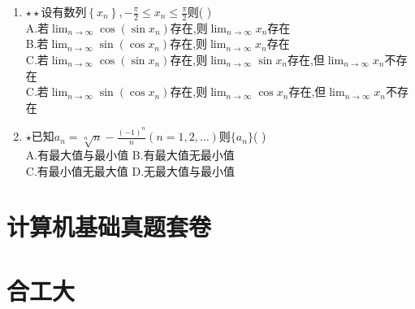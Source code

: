 \documentclass[12pt, a4paper, oneside, UTF8]{ctexbook}
\begin{document}
\begin{enumerate}
    \item $\star\star$设有数列$\left\{x_n\right\},-\frac{\pi}{2}\leq x_n\leq \frac{\pi}{2}$则(    )\\
    A.若$\displaystyle\lim_{n\to\infty}\cos{(\sin{x_n})}$存在,则$\displaystyle\lim_{n\to\infty}x_n$存在 \\
    B.若$\displaystyle\lim_{n\to\infty}\sin{(\cos{x_n})}$存在,则$\displaystyle\lim_{n\to\infty}x_n$存在 \\
    C.若$\displaystyle\lim_{n\to\infty}\cos{(\sin{x_n})}$存在,则$\displaystyle\lim_{n\to\infty}\sin{x_n}$存在,但$\displaystyle\lim_{n\to\infty}x_n$不存在 \\
    C.若$\displaystyle\lim_{n\to\infty}\sin{(\cos{x_n})}$存在,则$\displaystyle\lim_{n\to\infty}\cos{x_n}$存在,但$\displaystyle\lim_{n\to\infty}x_n$不存在

    \item $\star$已知$a_n=\sqrt[n]{n}-\frac{(-1)^n}{n}(n=1,2,\ldots)$则$\{a_n\}$(    )\\
    A.有最大值与最小值 \qquad B.有最大值无最小值\\ 
    C.有最小值无最大值 \qquad D.无最大值与最小值
\end{enumerate}


\section{计算机基础真题套卷}
\section{合工大}
\ifx\allfiles\undefined
\end{document}
